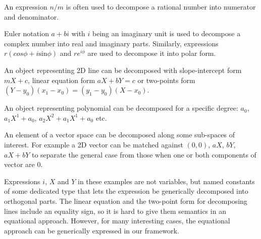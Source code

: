 \begin{compactitem}
\setlength{\itemsep}{0pt}
\setlength{\parskip}{0pt}
\item An expression $n/m$ is often used to decompose a rational number into 
      numerator and denominator.
\item Euler notation $a+bi$ with $i$ being an imaginary unit is used to 
      decompose a complex number into real and imaginary parts. Similarly, 
      expressions $r(cos \phi + i\mathrm{sin} \phi)$ and $re^{i\phi}$ are used to 
      decompose it into polar form.
\item An object representing 2D line can be decomposed with slope-intercept form 
      $mX+c$, linear equation form $aX+bY=c$ or two-points form 
      $(Y-y_0)(x_1-x_0)=(y_1-y_0)(X-x_0)$.
\item An object representing polynomial can be decomposed for a specific degree: 
      $a_0$, $a_1X^1+a_0$, $a_2X^2+a_1X^1+a_0$ etc.
\item An element of a vector space can be decomposed along some sub-spaces of 
      interest. For example a 2D vector can be matched against $(0,0)$, $aX$, 
      $bY$, $aX+bY$ to separate the general case from those when one or both
      components of vector are $0$.
\end{compactitem}

\noindent
Expressions $i$, $X$ and $Y$ in these examples are not variables, but named 
constants of some dedicated type that lets the expression be generically 
decomposed into orthogonal parts. The linear equation and the two-point 
form for decomposing lines include an equality sign, so it is
hard to give them semantics in an equational approach. However,  for many 
interesting cases, the 
equational approach can be generically expressed in our framework.

%


